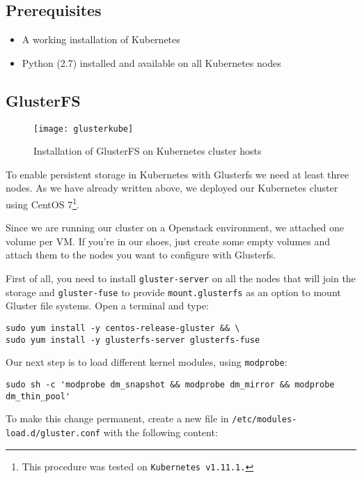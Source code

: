 \subsection{Prerequisites}
\label{prerequisites}

\begin{itemize}
\item A working installation of Kubernetes
\item Python (2.7) installed and available on all Kubernetes nodes
\end{itemize}

\subsection{GlusterFS}
\label{glusterfs}

\begin{figure}[htbp]
\centering
\texttt{[image: glusterkube]}
\caption{Installation of GlusterFS on Kubernetes cluster hosts}
\end{figure}

To enable persistent storage in Kubernetes with Glusterfs we need at
least three nodes. As we have already written above, we deployed our
Kubernetes cluster using CentOS 7\footnote{This procedure was tested on 
\texttt{Kubernetes\ v1.11.1.}}.

Since we are running our cluster on a Openstack environment, we attached
one volume per VM. If you're in our shoes, just create some empty
volumes and attach them to the nodes you want to configure with Glusterfs.

First of all, you need to install \texttt{gluster-server} on all the
nodes that will join the storage and \texttt{gluster-fuse} to provide
\texttt{mount.glusterfs} as an option to mount Gluster file systems.
Open a terminal and type:

\begin{lstlisting}
sudo yum install -y centos-release-gluster && \
sudo yum install -y glusterfs-server glusterfs-fuse
\end{lstlisting}

Our next step is to load different kernel modules, using
\texttt{modprobe}:

\begin{lstlisting}
sudo sh -c 'modprobe dm_snapshot && modprobe dm_mirror && modprobe dm_thin_pool'
\end{lstlisting}

To make this change permanent, create a new file in
\texttt{/etc/modules-load.d/gluster.conf} with the following content:


